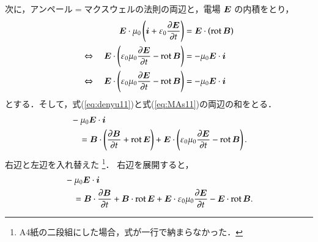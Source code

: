         次に，アンペール$=$マクスウェルの法則の両辺と，電場 $\boldsymbol{E}$ の内積をとり，
                                \begin{align}\label{eq:MAs11}
                                \bE\cdot\mu_{0}\left(\bi+
                                \varepsilon_{0}\frac{\rd \bE}{\rd t}
                                \right)
                                &=\bE\cdot\left(\mathrm{rot\,}
                                \bB\right)
                                \notag \\
                                \Leftrightarrow \quad
                                \bE\cdot\left(
                                \varepsilon_{0}\mu_{0}\frac{\rd \bE}{\rd t}
                                -\mathrm{rot\,}\bB\right)
                                &=-\mu_{0}\bE\cdot\bi
                                \notag \\
                                \Leftrightarrow \quad
                                \bE\cdot\left(
                                \varepsilon_{0}\mu_{0}\frac{\rd \bE}{\rd t}
                                -\mathrm{rot\,}\bB\right)
                                &=-\mu_{0}\bE\cdot\bi
                                \end{align}
        とする．そして，式(\ref{eq:denyu11})と式(\ref{eq:MAs11})の両辺の和をとる．
                                \begin{align}
                                &-\mu_{0}\boldsymbol{E}\cdot\boldsymbol{i} \notag \\
                                &\quad =
                                \boldsymbol{B}\cdot\left(\frac{\partial \boldsymbol{B}}{\partial t}
                                +\mathrm{rot}\, \boldsymbol{E}\right)
                                +\boldsymbol{E}\cdot\left(
                                \varepsilon_{0}\mu_{0}\frac{\partial \boldsymbol{E}}{\partial t}
                                -\mathrm{rot}\, \boldsymbol{B}\right).
                                \end{align}
        右辺と左辺を入れ替えた
                \footnote{
                        A4紙の二段組にした場合，式が一行で納まらなかった．
                }．
            右辺を展開すると，
                                \begin{align}\label{elect_Energy1}
                                &-\mu_{0}\bE\cdot\bi \notag \\
                                &\quad =
                                \bB\cdot\frac{\rd \bB}{\rd t}
                                +\bB\cdot\drot\bE
                                +\bE\cdot\varepsilon_{0}\mu_{0}\frac{\rd \bE}{\rd t}
                                -\bE\cdot\drot\bB.
                                \end{align}

